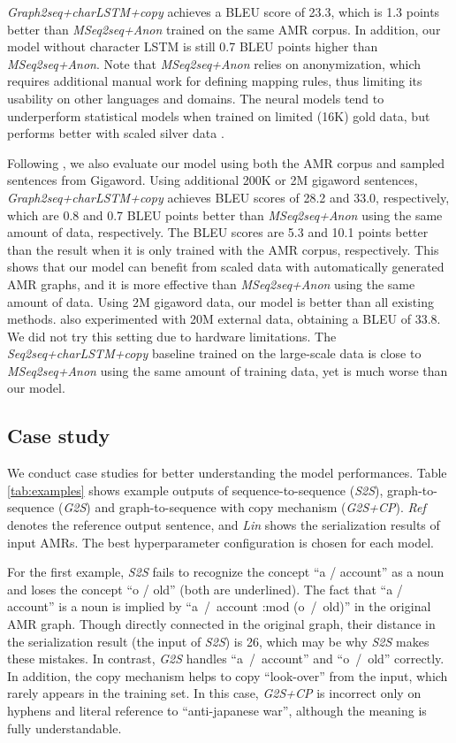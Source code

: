 \documentclass[11pt,a4paper]{article}
\begin{document}
\emph{Graph2seq+charLSTM+copy} achieves a BLEU score of 23.3, which is 1.3 points better than \emph{MSeq2seq+Anon} trained on the same AMR corpus.
In addition, our model without character LSTM is still 0.7 BLEU points higher than \emph{MSeq2seq+Anon}.
Note that \emph{MSeq2seq+Anon} relies on anonymization, which requires additional manual work for defining mapping rules, thus limiting its usability on other languages and domains.
The neural models tend to underperform statistical models when trained on limited (16K) gold data, but performs better with scaled silver data \cite{konstas-EtAl:2017:Long}.


Following , we also evaluate our model using both the AMR corpus and sampled sentences from Gigaword.
Using additional 200K or 2M gigaword sentences, \emph{Graph2seq+charLSTM+copy} achieves BLEU scores of 28.2 and 33.0, respectively, which are 0.8 and 0.7 BLEU points better than \emph{MSeq2seq+Anon} using the same amount of data, respectively.
The BLEU scores are 5.3 and 10.1 points better than the result when it is only trained with the AMR corpus, respectively.
This shows that our model can benefit from scaled data with automatically generated AMR graphs, and it is more effective than \emph{MSeq2seq+Anon} using the same amount of data.
Using 2M gigaword data, our model is better than all existing methods.
 also experimented with 20M external data, obtaining a BLEU of 33.8.
We did not try this setting due to hardware limitations.
The \emph{Seq2seq+charLSTM+copy} baseline trained on the large-scale data is close to \emph{MSeq2seq+Anon} using the same amount of training data, yet is much worse than our model.  


\subsection{Case study}


We conduct case studies for better understanding the model performances.
Table \ref{tab:examples} shows example outputs of sequence-to-sequence  (\emph{S2S}), graph-to-sequence (\emph{G2S}) and graph-to-sequence with copy mechanism (\emph{G2S+CP}). 
\emph{Ref} denotes the reference output sentence, and \emph{Lin} shows the serialization results of input AMRs.
The best hyperparameter configuration is chosen for each model.


For the first example, \emph{S2S} fails to recognize the concept ``a / account'' as a noun and loses the concept ``o / old'' (both are underlined).
The fact that ``a / account'' is a noun is implied by ``a~/~account :mod (o~/~old)'' in the original AMR graph.
Though directly connected in the original graph, their distance in the serialization result (the input of \emph{S2S}) is 26, which 
may be why \emph{S2S} makes these mistakes.
In contrast, \emph{G2S} handles ``a~/~account'' and ``o~/~old'' correctly.
In addition, the copy mechanism helps to copy ``look-over'' from the input, which rarely appears in the training set.
In this case, \emph{G2S+CP} is incorrect only on hyphens and literal reference to ``anti-japanese war'', although the meaning is fully understandable.
\end{document}
